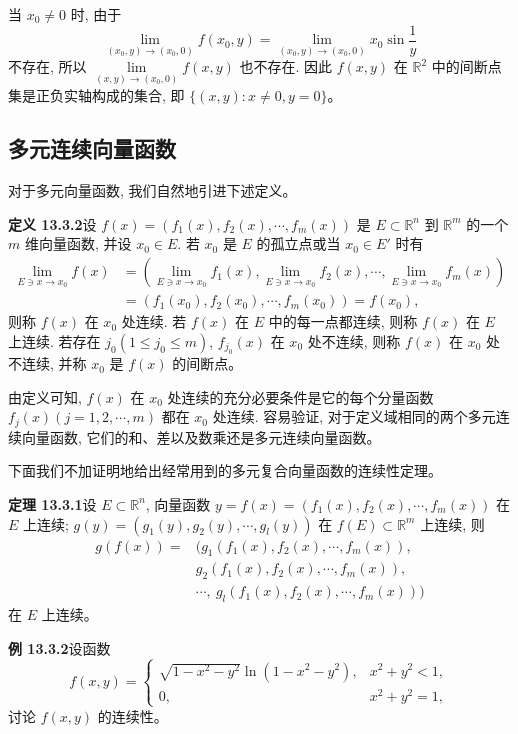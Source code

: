 \documentclass[UTF8, 12pt, fontset=fandol, oneside]{ctexart}
\begin{document}
当 $x_0\ne0$ 时, 由于
\[
  \lim_{(x_0,y)\to(x_0,0)}f(x_0,y)
  =\lim_{(x_0,y)\to(x_0,0)}x_0\sin\frac1y
\]
不存在, 所以 $\lim\limits_{(x,y)\to(x_0,0)}f(x,y)$ 也不存在. 因此 $f(x,y)$ 在 $\mathbb R^2$ 中的间断点集是正负实轴构成的集合, 即 $\{(x,y):x\ne0,y=0\}$。

\subsection{多元连续向量函数}

对于多元向量函数, 我们自然地引进下述定义。

\noindent\textbf{定义 13.3.2}\quad 设 $f(x)=(f_1(x),f_2(x),\cdots,f_m(x))$ 是 $E\subset\mathbb R^n$ 到 $\mathbb R^m$ 的一个 $m$ 维向量函数, 并设 $x_0\in E$. 若 $x_0$ 是 $E$ 的孤立点或当 $x_0\in E'$ 时有
\[
\begin{aligned}
  \lim_{E\ni x\to x_0}f(x)
  &=
  \left(\lim_{E\ni x\to x_0}f_1(x),
  \lim_{E\ni x\to x_0}f_2(x),
  \cdots,\lim_{E\ni x\to x_0}f_m(x)\right)\\
  &=(f_1(x_0),f_2(x_0),\cdots,f_m(x_0))=f(x_0),
\end{aligned}
\]
则称 $f(x)$ 在 $x_0$ 处连续. 若 $f(x)$ 在 $E$ 中的每一点都连续, 则称 $f(x)$ 在 $E$ 上连续. 若存在 $j_0(1\leqslant j_0\leqslant m)$, $f_{j_0}(x)$ 在 $x_0$ 处不连续, 则称 $f(x)$ 在 $x_0$ 处不连续, 并称 $x_0$ 是 $f(x)$ 的间断点。

由定义可知, $f(x)$ 在 $x_0$ 处连续的充分必要条件是它的每个分量函数 $f_j(x)(j=1,2,\cdots,m)$ 都在 $x_0$ 处连续. 容易验证, 对于定义域相同的两个多元连续向量函数, 它们的和、差以及数乘还是多元连续向量函数。

下面我们不加证明地给出经常用到的多元复合向量函数的连续性定理。

\noindent\textbf{定理 13.3.1}\quad 设 $E\subset\mathbb R^n$, 向量函数 $y=f(x)=(f_1(x),f_2(x),\cdots,f_m(x))$ 在 $E$ 上连续; $g(y)=(g_1(y),g_2(y),\cdots,g_l(y))$ 在 $f(E)\subset\mathbb R^m$ 上连续, 则
\[
\begin{aligned}
  g(f(x))={}&(g_1(f_1(x),f_2(x),\cdots,f_m(x)),\\
  &g_2(f_1(x),f_2(x),\cdots,f_m(x)),\\
  &\cdots,\ g_l(f_1(x),f_2(x),\cdots,f_m(x)))
\end{aligned}
\]
在 $E$ 上连续。

\noindent\textbf{例 13.3.2}\quad 设函数
\[
  f(x,y)=
  \begin{cases}
    \sqrt{1-x^2-y^2}\ln(1-x^2-y^2), & x^2+y^2<1,\\
    0, & x^2+y^2=1,
  \end{cases}
\]
讨论 $f(x,y)$ 的连续性。
\end{document}
